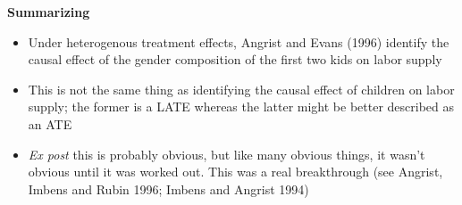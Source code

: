 \documentclass[notes=show]{beamer}
\begin{document}
\begin{frame}[plain]

\begin{center}
\textbf{Summarizing}
\end{center}

		\begin{itemize}
		\item Under heterogenous treatment effects, Angrist and Evans (1996) identify the causal effect of the gender composition of the first two kids on labor supply		
		\item This is not the same thing as identifying the causal effect of children on labor supply; the former is a LATE whereas the latter might be better described as an ATE
		\item \emph{Ex post} this is probably obvious, but like many obvious things, it wasn't obvious until it was worked out.  This was a real breakthrough (see Angrist, Imbens and Rubin 1996; Imbens and Angrist 1994)
		\end{itemize}

\end{frame}
	

	
	
\end{document}
